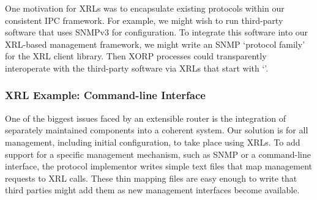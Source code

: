 
One motivation for XRLs was to encapsulate existing
protocols within our consistent IPC framework.   For example, we
might wish to run third-party software that uses SNMPv3 for
configuration. 
To integrate this software into our XRL-based management framework, we
might write an SNMP `protocol family' for the XRL client library.
Then XORP processes could transparently interoperate with the third-party
software via XRLs that start with `'.

\subsubsection{XRL Example: Command-line Interface}

One of the biggest issues faced by an {extensible} router is 
the integration of separately maintained components into a coherent
system.  
Our solution is for all management, including initial configuration, to
take place using XRLs.  To add support for a specific management
mechanism, such as SNMP or a command-line interface, the protocol
implementor writes simple text files that map management requests to
XRL calls.  These thin mapping files are easy enough to write that
third parties might add them as new management interfaces become
available.

